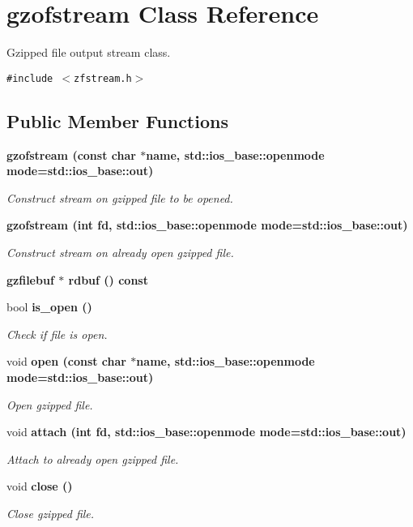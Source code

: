 \section{gzofstream Class Reference}
\label{classgzofstream}
Gzipped file output stream class.  


{\tt \#include $<$zfstream.h$>$}

\subsection*{Public Member Functions}
\begin{CompactItemize}
\item 
\bf{gzofstream} (const char $\ast$name, std::ios\_\-base::openmode mode=std::ios\_\-base::out)
\begin{CompactList}\small\item\em Construct stream on gzipped file to be opened. \item\end{CompactList}\item 
\bf{gzofstream} (int fd, std::ios\_\-base::openmode mode=std::ios\_\-base::out)
\begin{CompactList}\small\item\em Construct stream on already open gzipped file. \item\end{CompactList}\item 
\bf{gzfilebuf} $\ast$ \bf{rdbuf} () const 
\item 
bool \bf{is\_\-open} ()
\begin{CompactList}\small\item\em Check if file is open. \item\end{CompactList}\item 
void \bf{open} (const char $\ast$name, std::ios\_\-base::openmode mode=std::ios\_\-base::out)
\begin{CompactList}\small\item\em Open gzipped file. \item\end{CompactList}\item 
void \bf{attach} (int fd, std::ios\_\-base::openmode mode=std::ios\_\-base::out)
\begin{CompactList}\small\item\em Attach to already open gzipped file. \item\end{CompactList}\item 
void \bf{close} ()
\begin{CompactList}\small\item\em Close gzipped file. \item\end{CompactList}\end{CompactItemize}


